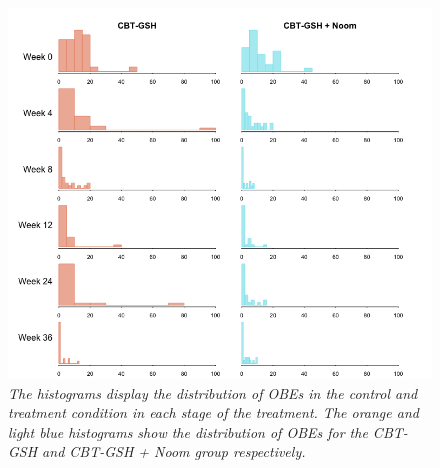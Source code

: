 \documentclass{article}
\begin{document}
\begin{figure}[H]
\begin{center}
\includegraphics[width=\textwidth, height=\textheight, keepaspectratio]{noom_hist.png}
\end{center}
\caption{\emph{The histograms display the distribution of OBEs in the control and treatment condition in each stage of the treatment. The orange and light blue histograms show the distribution of OBEs for the CBT-GSH and CBT-GSH  + Noom group respectively.}}
\end{figure}
\end{document}
